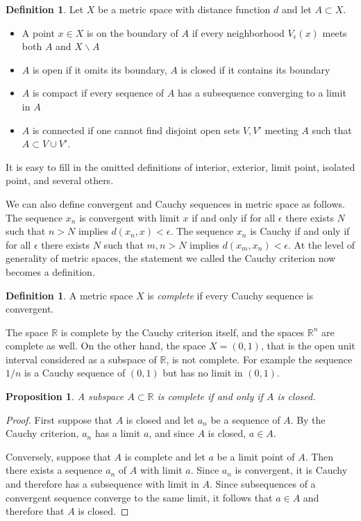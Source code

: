 \documentclass[11pt,oneside]{amsbook}
\newcommand{\RR}{\mathbb R}
\theoremstyle{definition}
\theoremstyle{plain}
\newtheorem{prop}[thm]{Proposition}
\theoremstyle{definition}
\newtheorem{defn}[thm]{Definition}
\theoremstyle{remark}
\numberwithin{equation}{section}
\numberwithin{figure}{section}
\begin{document}
\begin{defn}
  Let $X$ be a metric space with distance function $d$ and let $A\subset X$.
  \begin{itemize}
  \item A point $x\in X$ is on the boundary of $A$ if every neighborhood $V_\epsilon(x)$ meets both $A$ and $X\smallsetminus A$
  \item $A$ is open if it omits its boundary, $A$ is closed if it contains its boundary
  \item $A$ is compact if every sequence of $A$ has a subsequence converging to a limit in $A$
  \item $A$ is connected if one cannot find disjoint open sets $V,V'$ meeting $A$ such that $A\subset V\cup V'$.
  \end{itemize}
\end{defn}

It is easy to fill in the omitted definitions of interior, exterior, limit point, isolated point, and several others.

We can also define convergent and Cauchy sequences in metric space as follows. The sequence $x_n$ is convergent with limit $x$ if and only if for all $\epsilon$ there exists $N$ such that $n>N$ implies $d(x_n,x)<\epsilon$. The sequence $x_n$ is Cauchy if and only if for all $\epsilon$ there exists $N$ such that $m,n>N$ implies $d(x_m,x_n)<\epsilon$. At the level of generality of metric spaces, the statement we called the Cauchy criterion now becomes a definition.

\begin{defn}
  A metric space $X$ is \emph{complete} if every Cauchy sequence is convergent.
\end{defn}

The space $\RR$ is complete by the Cauchy criterion itself, and the spaces $\RR^n$ are complete as well. On the other hand, the space $X=(0,1)$, that is the open unit interval considered as a subspace of $\RR$, is not complete. For example the sequence $1/n$ is a Cauchy sequence of $(0,1)$ but has no limit in $(0,1)$.

\begin{prop}
  A subspace $A\subset\RR$ is complete if and only if $A$ is closed.
\end{prop}

\begin{proof}
  First suppose that $A$ is closed and let $a_n$ be a sequence of $A$. By the Cauchy criterion, $a_n$ has a limit $a$, and since $A$ is closed, $a\in A$. 

  Conversely, suppose that $A$ is complete and let $a$ be a limit point of $A$. Then there exists a sequence $a_n$ of $A$ with limit $a$. Since $a_n$ is convergent, it is Cauchy and therefore has a subsequence with limit in $A$. Since subsequences of a convergent sequence converge to the same limit, it follows that $a\in A$ and therefore that $A$ is closed.
\end{proof}
\end{document}
